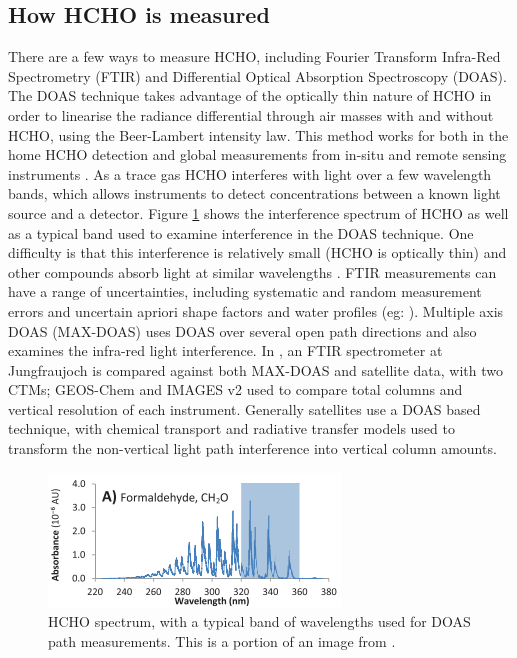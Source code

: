   \subsection{How HCHO is measured}
    There are a few ways to measure HCHO, including Fourier Transform Infra-Red Spectrometry (FTIR) and Differential Optical Absorption Spectroscopy (DOAS).
    The DOAS technique takes advantage of the optically thin nature of HCHO in order to linearise the radiance differential through air masses with and without HCHO, using the Beer-Lambert intensity law.
    This method works for both in the home HCHO detection and global measurements from in-situ and remote sensing instruments \citep{Guenther1995, Abad2015, Davenport2015}.
    As a trace gas HCHO interferes with light over a few wavelength bands, which allows instruments to detect concentrations between a known light source and a detector.
    Figure \ref{LR:fig:HCHOSpectrum} shows the interference spectrum of HCHO as well as a typical band used to examine interference in the DOAS technique.
    One difficulty is that this interference is relatively small (HCHO is optically thin) and other compounds absorb light at similar wavelengths \citep{Davenport2015}.
    FTIR measurements can have a range of uncertainties, including systematic and random measurement errors and uncertain apriori shape factors and water profiles (eg: \citet{Franco2015}).
    Multiple axis DOAS (MAX-DOAS) uses DOAS over several open path directions and also examines the infra-red light interference.
    In \citet{Franco2015}, an FTIR spectrometer at Jungfraujoch is compared against both MAX-DOAS and satellite data, with two CTMs; GEOS-Chem and IMAGES v2 used to compare total columns and vertical resolution of each instrument.
    Generally satellites use a DOAS based technique, with chemical transport and radiative transfer models used to transform the non-vertical light path interference into vertical column amounts.
    
    \begin{figure}
      \includegraphics{Figures/HCHO/HCHOAbsorbanceDavenport.png}
      \caption{ HCHO spectrum, with a typical band of wavelengths used for DOAS path measurements.
        This is a portion of an image from \citet{Davenport2015}.}
      \label{LR:fig:HCHOSpectrum}
    \end{figure}
    
